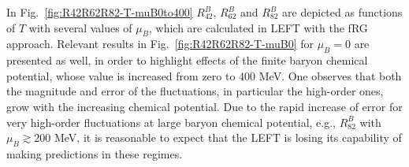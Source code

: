 \documentclass[%
reprint,
superscriptaddress,
showpacs,preprintnumbers,
amsmath,amssymb,
aps,
prd,
]{revtex4-1}
\def\Fig#1{Fig.~\ref{#1}} \def\Tab#1{Tab.~\ref{#1}}
\begin{document}
	
	In \Fig{fig:R42R62R82-T-muB0to400} $R^{B}_{42}$, $R^{B}_{62}$ and $R^{B}_{82}$ are depicted as functions of $T$ with several values of $\mu_B$, which are calculated in LEFT with the fRG approach. Relevant results in \Fig{fig:R42R62R82-T-muB0} for $\mu_B=0$ are presented as well, in order to highlight effects of the finite baryon chemical potential, whose value is increased from zero to 400 MeV. One observes that both the magnitude and error of the fluctuations, in particular the high-order ones, grow with the increasing chemical potential. Due to the rapid increase of error for very high-order fluctuations at large baryon chemical potential, e.g., $R^{B}_{82}$ with $\mu_B\gtrsim 200$ MeV, it is reasonable to expect that the LEFT is losing its capability of making predictions in these regimes.
	
	
\end{document}
